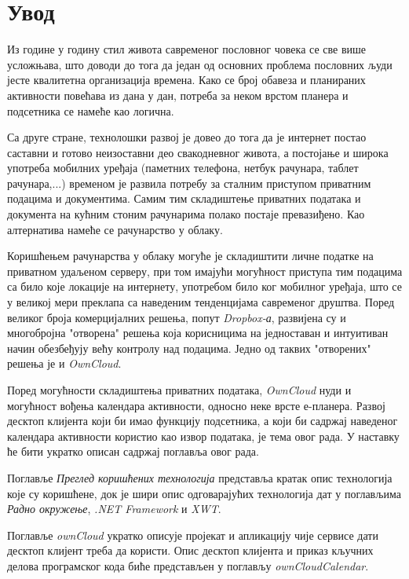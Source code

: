 \chapter{Увод}

Из године у годину стил живота савременог пословног човека се све више усложњава, што доводи до тога да један од основних проблема пословних људи јесте квалитетна организација времена. Како се број обавеза и планираних активности повећава из дана у дан, потреба за неком врстом планера и подсетника се намеће као логична.

Са друге стране, технолошки развој је довео до тога да је интернет постао саставни и готово неизоставни део свакодневног живота, а постојање и широка употреба мобилних уређаја (паметних телефона, нетбук рачунара, таблет рачунара,...) временом је развила потребу за сталним приступом приватним подацима и документима. Самим тим складиштење приватних података и документа на кућним стоним рачунарима полако постаје превазиђено. Као алтернатива намеће се рачунарство у облаку.

Коришћењем рачунарства у облаку могуће је складиштити личне податке на приватном удаљеном серверу, при том имајући могућност приступа тим подацима са било које локације на интернету, употребом било ког мобилног уређаја, што се у великој мери преклапа са наведеним тенденцијама савременог друштва. Поред великог броја комерцијалних решења, попут \textit{Dropbox-а}, развијена су и многобројна "отворена" решења која корисницима на једноставан и интуитиван начин обезбеђују већу контролу над подацима. Једно од таквих "отворених" решења је и \textit{OwnCloud}. 

Поред могућности складиштења приватних података, \textit{OwnCloud} нуди и могућност вођења календара активности, односно неке врсте е-планера. Развој десктоп клијента који би имао функцију подсетника, а који би садржај наведеног календара активности користио као извор података, је тема овог рада. У наставку ће бити укратко описан садржај поглавља овог рада.

Поглавље \textit{Преглед коришћених технологија} представља кратак опис технологија које су коришћене, док је шири опис одговарајућих технологија дат у поглављима \textit{Радно окружење}, \textit{.NET Framework} и \textit{XWT}.

Поглавље \textit{ownCloud} укратко описује пројекат и апликацију чије сервисе дати десктоп клијент треба да користи. Опис десктоп клијента и приказ кључних делова програмског кода биће представљен у поглављу \textit{ownCloudCalendar}. 
